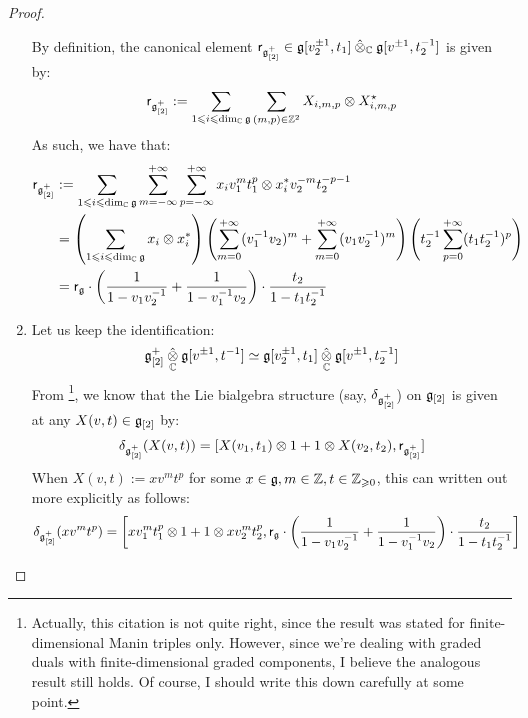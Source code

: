 \begin{proof}
\begin{enumerate}
                        By definition, the canonical element $\sfr_{\g_{[2]}^+} \in \g[v_2^{\pm 1}, t_1] \hattensor_{\bbC} \g[v^{\pm 1}, t_2^{-1}]$ is given by:
                            $$\sfr_{\g_{[2]}^+} := \sum_{1 \leq i \leq \dim_{\bbC} \g} \sum_{(m, p) \in \Z^2} X_{i, m, p} \tensor X_{i, m, p}^{\star}$$
                        As such, we have that:
                            $$
                                \begin{aligned}
                                    \sfr_{\g_{[2]}^+} & := \sum_{1 \leq i \leq \dim_{\bbC} \g} \sum_{m = -\infty}^{+\infty} \sum_{p = -\infty}^{+\infty} x_i v_1^m t_1^p \tensor x_i^* v_2^{-m} t_2^{-p - 1}
                                    \\
                                    & = \left( \sum_{1 \leq i \leq \dim_{\bbC} \g} x_i \tensor x_i^* \right) \left( \sum_{m = 0}^{+\infty} (v_1^{-1} v_2)^m + \sum_{m = 0}^{+\infty} (v_1 v_2^{-1})^m \right) \left( t_2^{-1} \sum_{p = 0}^{+\infty} (t_1 t_2^{-1})^p \right)
                                    \\
                                    & = \sfr_{\g} \cdot \left( \frac{1}{1 - v_1 v_2^{-1}} + \frac{1}{1 - v_1^{-1} v_2} \right) \cdot \frac{t_2}{1 - t_1 t_2^{-1}}
                                \end{aligned}
                            $$
                        \item Let us keep the identification:
                            $$\g_{[2]}^+ \hattensor_{\bbC} \g[v^{\pm 1}, t^{-1}] \cong \g[v_2^{\pm 1}, t_1] \hattensor_{\bbC} \g[v^{\pm 1}, t_2^{-1}]$$
                        From \cite[pp. 5]{etingof_kazhdan_quantisation_1}\footnote{Actually, this citation is not quite right, since the result was stated for finite-dimensional Manin triples only. However, since we're dealing with graded duals with finite-dimensional graded components, I believe the analogous result still holds. Of course, I should write this down carefully at some point.}, we know that the Lie bialgebra structure (say, $\delta_{\g_{[2]}^+}$) on $\g_{[2]}$ is given at any $X(v, t) \in \g_{[2]}$ by:
                            $$\delta_{\g_{[2]}^+}( X(v, t) ) = [X(v_1, t_1) \tensor 1 + 1 \tensor X(v_2, t_2), \sfr_{\g_{[2]}^+}]$$
                        When $X(v, t) := x v^m t^p$ for some $x \in \g, m \in \Z, t \in \Z_{\geq 0}$, this can written out more explicitly as follows:
                            $$
                                \begin{aligned}
                                    \delta_{\g_{[2]}^+}( x v^m t^p ) & = \left[x v_1^m t_1^p \tensor 1 + 1 \tensor x v_2^m t_2^p, \sfr_{\g} \cdot \left( \frac{1}{1 - v_1 v_2^{-1}} + \frac{1}{1 - v_1^{-1} v_2} \right) \cdot \frac{t_2}{1 - t_1 t_2^{-1}}\right]

\end{aligned}$$
\end{enumerate}
\end{proof}
